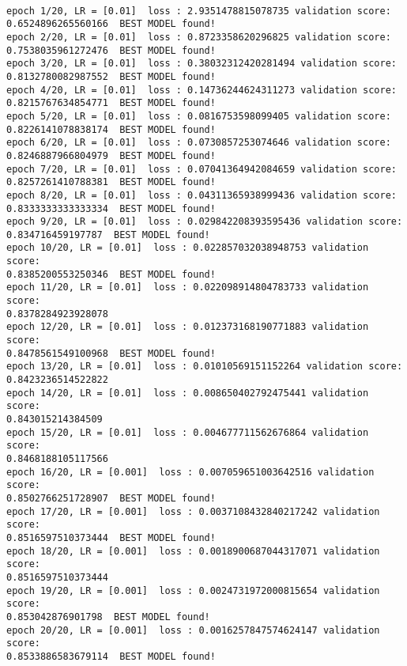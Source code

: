 \documentclass[11pt]{article}
\begin{document}
    \begin{Verbatim}[commandchars=\\\{\}]

epoch 1/20, LR = [0.01]  loss : 2.9351478815078735 validation score:
0.6524896265560166  BEST MODEL found!
epoch 2/20, LR = [0.01]  loss : 0.8723358620296825 validation score:
0.7538035961272476  BEST MODEL found!
epoch 3/20, LR = [0.01]  loss : 0.38032312420281494 validation score:
0.8132780082987552  BEST MODEL found!
epoch 4/20, LR = [0.01]  loss : 0.14736244624311273 validation score:
0.8215767634854771  BEST MODEL found!
epoch 5/20, LR = [0.01]  loss : 0.0816753598099405 validation score:
0.8226141078838174  BEST MODEL found!
epoch 6/20, LR = [0.01]  loss : 0.0730857253074646 validation score:
0.8246887966804979  BEST MODEL found!
epoch 7/20, LR = [0.01]  loss : 0.07041364942084659 validation score:
0.8257261410788381  BEST MODEL found!
epoch 8/20, LR = [0.01]  loss : 0.04311365938999436 validation score:
0.8333333333333334  BEST MODEL found!
epoch 9/20, LR = [0.01]  loss : 0.029842208393595436 validation score:
0.834716459197787  BEST MODEL found!
epoch 10/20, LR = [0.01]  loss : 0.022857032038948753 validation score:
0.8385200553250346  BEST MODEL found!
epoch 11/20, LR = [0.01]  loss : 0.022098914804783733 validation score:
0.8378284923928078
epoch 12/20, LR = [0.01]  loss : 0.012373168190771883 validation score:
0.8478561549100968  BEST MODEL found!
epoch 13/20, LR = [0.01]  loss : 0.01010569151152264 validation score:
0.8423236514522822
epoch 14/20, LR = [0.01]  loss : 0.008650402792475441 validation score:
0.843015214384509
epoch 15/20, LR = [0.01]  loss : 0.004677711562676864 validation score:
0.8468188105117566
epoch 16/20, LR = [0.001]  loss : 0.007059651003642516 validation score:
0.8502766251728907  BEST MODEL found!
epoch 17/20, LR = [0.001]  loss : 0.0037108432840217242 validation score:
0.8516597510373444  BEST MODEL found!
epoch 18/20, LR = [0.001]  loss : 0.0018900687044317071 validation score:
0.8516597510373444
epoch 19/20, LR = [0.001]  loss : 0.0024731972000815654 validation score:
0.853042876901798  BEST MODEL found!
epoch 20/20, LR = [0.001]  loss : 0.0016257847574624147 validation score:
0.8533886583679114  BEST MODEL found!
\end{Verbatim}

    \begin{center}
    \end{center}
    { \hspace*{\fill} \\}
    
\end{document}
